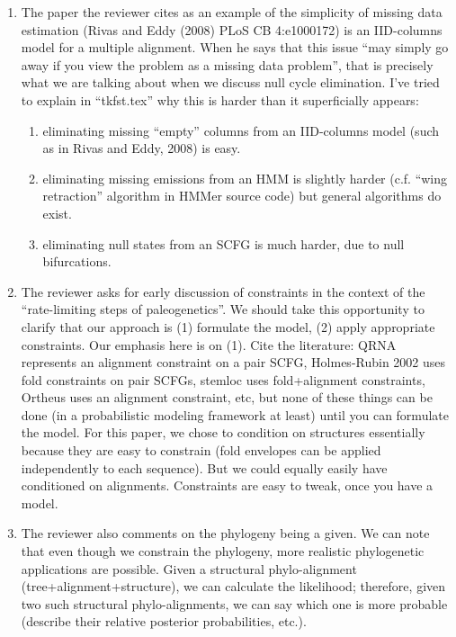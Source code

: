 {\begin{enumerate}
It shouldn't be too hard to write a latex command/macro that can be used (with ``$\sum$'' or ``$\max$'' as an argument) to generate complete versions of {\em both} algorithms.
%
\item The paper the reviewer cites as an example of the simplicity of missing data estimation (Rivas and Eddy (2008) PLoS CB 4:e1000172) is an IID-columns model for a multiple alignment.
When he says that this issue ``may simply go away if you view the problem as a missing data problem'',
that is precisely what we are talking about when we discuss null cycle elimination.
I've tried to explain in ``tkfst.tex'' why this is harder than it superficially appears:
\begin{enumerate}
\item eliminating missing ``empty'' columns from an IID-columns model (such as in Rivas and Eddy, 2008) is easy.
\item eliminating missing emissions from an HMM is slightly harder (c.f. ``wing retraction'' algorithm in HMMer source code)
but general algorithms do exist.
\item eliminating null states from an SCFG is much harder, due to null bifurcations.
\end{enumerate}
%
\item The reviewer asks for early discussion of constraints in the context of the ``rate-limiting steps of paleogenetics''.
We should take this opportunity to clarify that our approach is (1) formulate the model,  (2) apply appropriate constraints.
Our emphasis here is on (1).
Cite the literature: QRNA represents an alignment constraint on a pair SCFG, Holmes-Rubin 2002 uses fold constraints on pair SCFGs,
stemloc uses fold+alignment constraints, Ortheus uses an alignment constraint, etc, but none of these things can be done
(in a probabilistic modeling framework at least) until you can formulate the model.
For this paper, we chose to condition on structures essentially because they are easy to constrain
(fold envelopes can be applied independently to each sequence).
But we could equally easily have conditioned on alignments. Constraints are easy to tweak, once you have a model.
%
\item The reviewer also comments on the phylogeny being a given.
We can note that even though we constrain the phylogeny, more realistic phylogenetic applications are possible.
Given a structural phylo-alignment (tree+alignment+structure), we can calculate the likelihood; therefore, given two such structural phylo-alignments,
we can say which one is more probable (describe their relative posterior probabilities, etc.).

\end{enumerate}}
